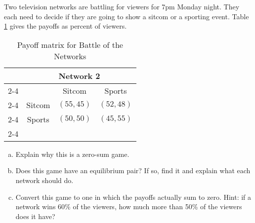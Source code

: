 \begin{xca}\label{E:network}
Two television networks are battling for viewers for 7pm Monday night. They each need to decide if they are going to show a sitcom or a sporting event. Table \ref{T:network} gives the payoffs as percent of viewers.





\begin{table}[h]
\centering

\begin{tabular}{cccc}
                      & \multicolumn{3}{c}{Network 2}                                                  \\ \cline{2-4} 
\multicolumn{1}{l|}{} & \multicolumn{1}{l|}{} & \multicolumn{1}{c|}{Sitcom} & \multicolumn{1}{c|}{Sports} \\ \cline{2-4} 
\multicolumn{1}{l|}{Network 1} & \multicolumn{1}{c|}{Sitcom} & \multicolumn{1}{c|}{$(55, 45)$} & \multicolumn{1}{c|}{$(52, 48)$} \\ \cline{2-4} 
\multicolumn{1}{l|}{} & \multicolumn{1}{c|}{Sports} & \multicolumn{1}{c|}{$(50, 50)$} & \multicolumn{1}{c|}{$(45, 55)$} \\ \cline{2-4} 
\end{tabular}
\caption{Payoff matrix for Battle of the Networks}
\label{T:network}
\end{table}


\begin{enumerate}[(a)]
\item Explain why this is a zero-sum game.

\item Does this game have an equilibrium pair? If so, find it and explain what each network should do.

\item Convert this game to one in which the payoffs actually sum to zero. Hint: if a network wins 60\% of the viewers, how much more than 50\% of the viewers does it have?

\end{enumerate}
\end{xca}

